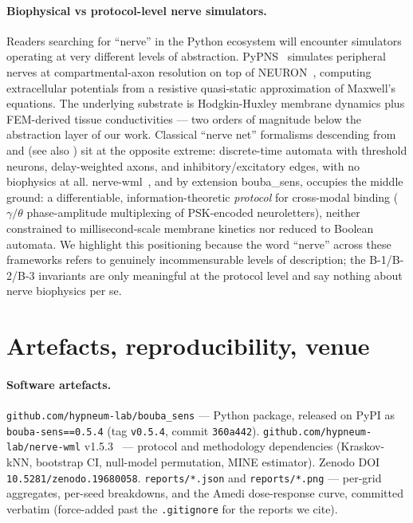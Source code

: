 \documentclass{article}
\begin{document}
\paragraph{Biophysical vs protocol-level nerve simulators.}
Readers searching for ``nerve'' in the Python ecosystem will
encounter simulators operating at very different levels of
abstraction. PyPNS~\citep{lubba2019pypns} simulates peripheral
nerves at compartmental-axon resolution on top of
NEURON~\citep{hines2001neuron}, computing extracellular
potentials from a resistive quasi-static approximation of
Maxwell's equations. The underlying substrate is Hodgkin-Huxley
membrane dynamics plus FEM-derived tissue conductivities --- two
orders of magnitude below the abstraction layer of our work.
Classical ``nerve net'' formalisms descending from
\citet{mcculloch1943logical} and \citet{kleene1956representation}
(see also \citealp{mcnaughton1971counter}) sit at the opposite extreme:
discrete-time automata with threshold neurons, delay-weighted
axons, and inhibitory/excitatory edges, with no biophysics at
all. nerve-wml~\citep{saillant2026nervewml}, and by extension
bouba\_sens, occupies the middle ground: a differentiable,
information-theoretic \emph{protocol} for cross-modal binding
($\gamma/\theta$ phase-amplitude multiplexing of PSK-encoded
neuroletters), neither constrained to millisecond-scale membrane
kinetics nor reduced to Boolean automata. We highlight this
positioning because the word ``nerve'' across these frameworks
refers to genuinely incommensurable levels of description; the
B-1/B-2/B-3 invariants are only meaningful at the protocol
level and say nothing about nerve biophysics per se.


\section{Artefacts, reproducibility, venue}
\label{sec:artefacts}

\paragraph{Software artefacts.}
\texttt{github.com/hypneum-lab/bouba\_sens} --- Python package,
released on PyPI as \texttt{bouba-sens==0.5.4} (tag
\texttt{v0.5.4}, commit \texttt{360a442}).
\texttt{github.com/hypneum-lab/nerve-wml} v1.5.3~\citep{saillant2026nervewml}
--- protocol and methodology dependencies (Kraskov-kNN, bootstrap
CI, null-model permutation, MINE estimator). Zenodo DOI
\texttt{10.5281/zenodo.19680058}.
\texttt{reports/*.json} and \texttt{reports/*.png} --- per-grid
aggregates, per-seed breakdowns, and the Amedi dose-response
curve, committed verbatim (force-added past the
\texttt{.gitignore} for the reports we cite).
\end{document}

